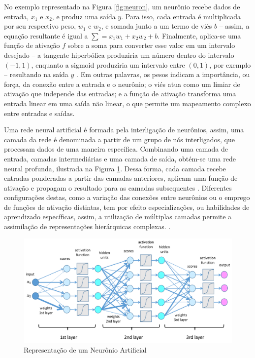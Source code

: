 No exemplo representado na Figura \ref{fig:neuron}, um neurônio recebe dados de entrada, $x_1$ e $x_2$, e produz uma saída $y$. Para isso, cada entrada é multiplicada por seu respectivo peso, $w_1$ e $w_2$, e somada junto a um termo de viés $b$ -- assim, a equação resultante é igual a $\sum = x_1 w_1 + x_2 w_2 + b$. Finalmente, aplica-se uma função de ativação $f$ sobre a soma para converter esse valor em um intervalo desejado -- a tangente hiperbólica produziria um número dentro do intervalo $(-1, 1)$, enquanto a sigmoid produziria um intervalo entre $(0, 1)$, por exemplo -- resultando na saída $y$ \cite{deeplearningbook}. Em outras palavras, os pesos indicam a importância, ou força, da conexão entre a entrada e o neurônio; o viés atua como um limiar de ativação que independe das entradas; e a função de ativação transforma uma entrada linear em uma saída não linear, o que permite um mapeamento complexo entre entradas e saídas. 

Uma rede neural artificial é formada pela interligação de neurônios, assim, uma camada da rede é denominada a partir de um grupo de nós interligados, que processam dados de uma maneira específica. Combinando uma camada de entrada, camadas intermediárias e uma camada de saída, obtém-se uma rede neural profunda, ilustrada na Figura \ref{fig:dnn}. Dessa forma, cada camada recebe entradas ponderadas a partir das camadas anteriores, aplicam uma função de ativação e propagam o resultado para as camadas subsequentes \cite{deeplearningbook}. Diferentes configurações destas, como a variação das conexões entre neurônios ou o emprego de funções de ativação distintas, tem por efeito especializações, ou habilidades de aprendizado específicas, assim, a utilização de múltiplas camadas permite a assimilação de representações hierárquicas complexas. \cite{reviewdeep}.

\begin{figure}[H]
	\caption{\label{fig:dnn}Representação de um Neurônio Artificial}
    \begin{center}
    \includegraphics[width=1\linewidth]{images/dnn.png}
	\end{center}
\end{figure}


